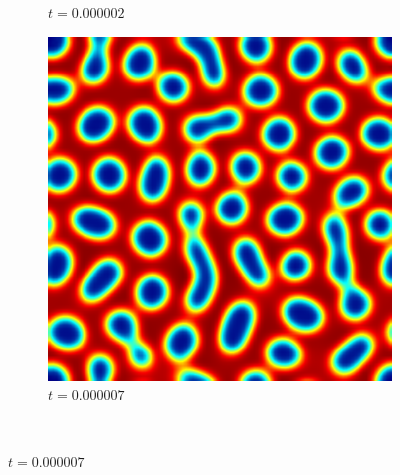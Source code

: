 \begin{figure}[ht]
\begin{subfigure}[t]{.3\linewidth}
		\vspace{-.4\baselineskip}
		\caption{$t=0.000002$}
	\end{subfigure}
	\begin{subfigure}[t]{.3\linewidth}
		\center
		\includegraphics[scale=.25]{stochastic_ch_2_7}
		\vspace{-.4\baselineskip}
		\caption{$t=0.000007$}
	\end{subfigure}\\
	\vspace{.2\baselineskip}


\end{figure}
